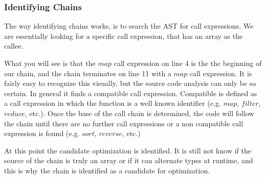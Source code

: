 \subsubsection{Identifying Chains}

The way identifying chains works, is to search the AST for call expressions.  We are essentially looking for a specific call expression, that has an array as the callee. 

\begin{minipage}{\linewidth}

\end{minipage}

What you will see is that the $map$ call expression on line 4 is the the beginning of our chain, and the chain terminates on line 11 with a $map$ call expression.  It is fairly easy to recognize this visually, but the source code analysis can only be so certain.  In general it finds a compatible call expression.  Compatible is defined as a call expression in which the function is a well known identifier (e.g. $map$, $filter$, $reduce$, etc.). Once the base of the call chain is determined, the code will follow the chain until there are no further call expressions or a non compatible call expression is found (e.g. $sort$, $reverse$, etc.)

At this point the candidate optimization is identified.  It is still not know if the source of the chain is truly an array or if it can alternate types at runtime, and this is why the chain is identified as a candidate for optimization. 

